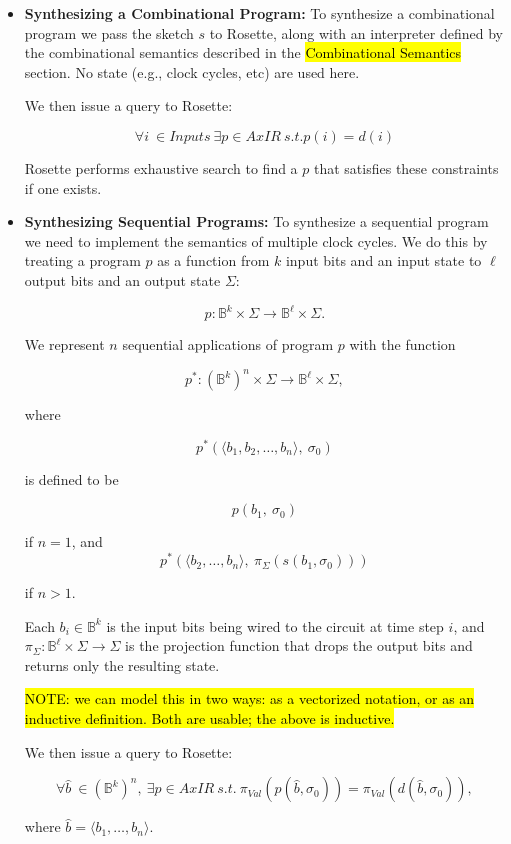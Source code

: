 \begin{itemize}
\item \textbf{Synthesizing a Combinational Program:}
  To synthesize a combinational
    program we pass the sketch
    $s$ to Rosette,
    along with an interpreter
    defined by the combinational
    semantics described in the
    \hl{Combinational Semantics}
    section.
  No state (e.g., clock cycles,
    etc) are used here.

  We then issue a query to Rosette:
  
  $$\forall i\ \in Inputs\ \exists p \in AxIR\ s.t. p(i) = d(i)$$

  Rosette performs exhaustive
    search to find
    a $p$ that satisfies
    these constraints
    if one exists.
    
\item \textbf{Synthesizing Sequential Programs:}
  To synthesize a sequential
    program we need to
    implement the semantics of
    multiple clock cycles.
  We do this by treating
    a program $p$ as a
    function from $k$ input
    bits and an input
    state to $\ell$ output
    bits and an output
    state $\Sigma$:

  $$p : \mathbb B^k \times \Sigma \to \mathbb B^\ell \times \Sigma.$$

  We represent $n$ 
    sequential applications
    of program $p$ with
    the function
    
  \[ p^{*}: \left(\mathbb{B}^k\right)^n \times \Sigma \to \mathbb{B}^\ell \times \Sigma,\]

  where

  \[p^{*}( \langle b_1, b_2, \ldots, b_n\rangle,\ \sigma_0)\]
  
  is defined to be
  
  $$p(b_1,\ \sigma_0)$$
  
  if $n = 1$, and
  \[p^{*}(\langle b_2, \ldots, b_n\rangle,\ \pi_\Sigma(s(b_1, \sigma_0)))\]
  
  if $n > 1$.



  Each $b_i \in \mathbb{B}^k$ 
    is the input bits 
    being wired to the
    circuit at time step $i$,
    and $\pi_\Sigma: \mathbb{B}^\ell \times \Sigma \to \Sigma$
    is the projection 
    function that drops
    the output bits and
    returns only the
    resulting state.

\hl{NOTE: we can model this in two ways: as a vectorized notation, or as an inductive definition. Both are usable; the above is inductive.}

  We then issue a query to Rosette:

  $$\forall \hat{b} \ \in \left(\mathbb{B}^k\right)^n,\ \exists p \in AxIR\ s.t.\ \pi_{Val} (p(\hat{b}, \sigma_0)) = \pi_{Val}(d(\hat{b}, \sigma_0)),$$

  where $\hat{b} = \langle b_1, \ldots, b_n\rangle$.

\end{itemize}

